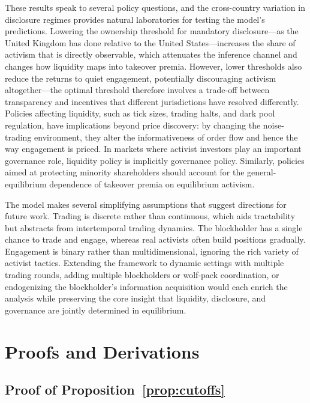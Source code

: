 \documentclass[11pt]{article}
\newcommand{\1}{\mathbf{1}}
\begin{document}
These results speak to several policy questions, and the cross-country variation in disclosure regimes provides natural laboratories for testing the model's predictions. Lowering the ownership threshold for mandatory disclosure---as the United Kingdom has done relative to the United States---increases the share of activism that is directly observable, which attenuates the inference channel and changes how liquidity maps into takeover premia. However, lower thresholds also reduce the returns to quiet engagement, potentially discouraging activism altogether---the optimal threshold therefore involves a trade-off between transparency and incentives that different jurisdictions have resolved differently. Policies affecting liquidity, such as tick sizes, trading halts, and dark pool regulation, have implications beyond price discovery: by changing the noise-trading environment, they alter the informativeness of order flow and hence the way engagement is priced. In markets where activist investors play an important governance role, liquidity policy is implicitly governance policy. Similarly, policies aimed at protecting minority shareholders should account for the general-equilibrium dependence of takeover premia on equilibrium activism.

The model makes several simplifying assumptions that suggest directions for future work. Trading is discrete rather than continuous, which aids tractability but abstracts from intertemporal trading dynamics. The blockholder has a single chance to trade and engage, whereas real activists often build positions gradually. Engagement is binary rather than multidimensional, ignoring the rich variety of activist tactics. Extending the framework to dynamic settings with multiple trading rounds, adding multiple blockholders or wolf-pack coordination, or endogenizing the blockholder's information acquisition would each enrich the analysis while preserving the core insight that liquidity, disclosure, and governance are jointly determined in equilibrium.

\newpage
\printbibliography

\newpage
\appendix
\section{Proofs and Derivations}
\label{app:proofs}

\subsection{Proof of Proposition~\ref{prop:cutoffs}}
\label{app:proof-cutoffs}
\end{document}

